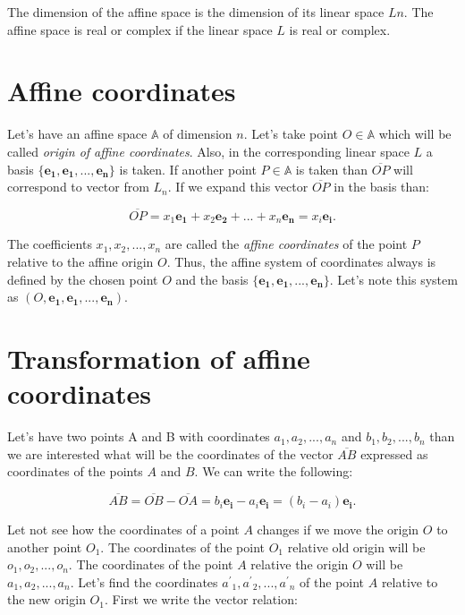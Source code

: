\documentclass{book}
\begin{document}
The dimension of the affine space is the dimension of its linear space $Ln$. The affine space is real or complex if the linear space $L$ is real or complex.

\section{Affine coordinates}

Let's have an affine space $\mathbb{A}$ of dimension $n$. Let's take point $O \in \mathbb{A}$ which will be called \emph{origin of affine coordinates}. Also, in the corresponding linear space $L$ a basis $\{\boldsymbol{e_1}, \boldsymbol{e_1}, ..., \boldsymbol{e_n}\}$ is taken. If another point $P \in \mathbb{A}$ is taken than $\overline{OP}$ will correspond to vector from $L_n$.
If we expand this vector $\overline{OP}$ in the basis than:

\begin{equation}
\overline{OP} = x_1\boldsymbol{e_1} + x_2\boldsymbol{e_2} + ... + x_n\boldsymbol{e_n} = x_i\boldsymbol{e_i}.
\end{equation}

The coefficients $x_1, x_2, ..., x_n$ are called the \emph{affine coordinates} of the point $P$ relative to the affine origin $O$. Thus, the affine system of coordinates always is defined by the chosen point $O$ and the basis $\{\boldsymbol{e_1}, \boldsymbol{e_1}, ..., \boldsymbol{e_n}\}$. Let's note this system as $(O, \boldsymbol{e_1}, \boldsymbol{e_1}, ..., \boldsymbol{e_n})$.

\section{Transformation of affine coordinates}

Let's have two points A and B with coordinates ${a_1, a_2, ..., a_n}$ and ${b_1, b_2, ..., b_n}$ than we are interested what will be the coordinates of the vector $\overline{AB}$ expressed as coordinates of the points $A$ and $B$. We can write the following:

\[\overline{AB} = \overline{OB} - \overline{OA} = b_i\boldsymbol{e_i} - a_i\boldsymbol{e_i} = (b_i - a_i)\boldsymbol{e_i}. \] 

Let not see how the coordinates of a point $A$ changes if we move the origin $O$ to another point $O_1$. The coordinates of the point $O_1$ relative old origin will be ${o_1, o_2, ..., o_n}$. The coordinates of the point $A$ relative the origin $O$ will be ${a_1, a_2, ..., a_n}$. Let's find the coordinates ${a{^'}_1, a{^'}_2, ..., a{^'}_n}$ of the point $A$ relative to the new origin $O_1$. First we write the vector relation:
\end{document}
